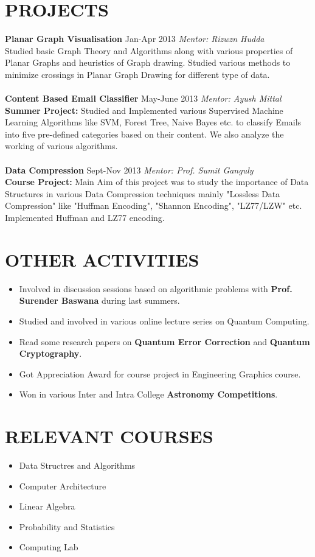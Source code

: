 \documentclass[margin, 10pt]{res} %
\begin{document}
\begin{resume}
\section{PROJECTS}
{\bf Planar Graph Visualisation} \hfill Jan-Apr 2013 \hfill {\sl Mentor: Rizwzn Hudda} \\ 
Studied basic Graph Theory and Algorithms along with various properties of Planar Graphs and heuristics of Graph drawing. Studied various methods to minimize crossings in Planar Graph Drawing for different type of data.\\\\
{\bf Content Based Email Classifier} \hfill May-June 2013 \hfill {\sl Mentor: Ayush Mittal} \\
{\bf Summer Project:} Studied and Implemented various Supervised Machine Learning Algorithms like SVM, Forest Tree, Naive Bayes etc. to classify Emails into five pre-defined categories based on their content. We also analyze the working of various algorithms. \\\\
{\bf Data Compression} \hfill Sept-Nov 2013 \hfill {\sl Mentor: Prof. Sumit Ganguly}\\
{\bf Course Project:} Main Aim of this project was to study the importance of Data Structures in various Data Compression techniques mainly "Lossless Data Compression" like "Huffman Encoding", "Shannon Encoding", "LZ77/LZW" etc. Implemented Huffman and LZ77 encoding.\\
\section{OTHER ACTIVITIES}
\begin{itemize}
\item Involved in discussion sessions based on algorithmic problems with {\bf Prof. Surender Baswana} during last summers.
\item Studied and involved in various online lecture series on Quantum Computing.
\item Read some research papers on {\bf Quantum Error Correction} and {\bf Quantum Cryptography}.
\item Got Appreciation Award for course project in Engineering Graphics course.
\item Won in various Inter and Intra College {\bf Astronomy Competitions}.
\end{itemize}
\section{RELEVANT COURSES}
\begin{multicols}{2}
\begin{itemize}
\item Data Structres and Algorithms
\item Computer Architecture
\item Linear Algebra
\item Probability and Statistics 
\item Computing Lab
\end{itemize}
\end{multicols}

\end{resume}
\end{document}
